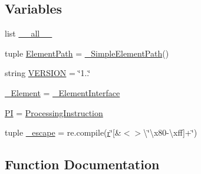 \subsection*{Variables}
\begin{DoxyCompactItemize}
\item 
list \hyperlink{namespacePyQt-x11-gpl-4_811_82_1_1elementtree_1_1ElementTree_ad8cd84242cec6f65061963a8bcc2ce48}{\+\_\+\+\_\+all\+\_\+\+\_\+}
\item 
tuple \hyperlink{namespacePyQt-x11-gpl-4_811_82_1_1elementtree_1_1ElementTree_a2e7ab0b9092c3db34b5f273220506b52}{Element\+Path} = \hyperlink{classPyQt-x11-gpl-4_811_82_1_1elementtree_1_1ElementTree_1_1__SimpleElementPath}{\+\_\+\+Simple\+Element\+Path}()
\item 
string \hyperlink{namespacePyQt-x11-gpl-4_811_82_1_1elementtree_1_1ElementTree_afe7ce87e065a19e640fb9f1b94b4aff3}{V\+E\+R\+S\+I\+O\+N} = \char`\"{}1..\char`\"{}
\item 
\hyperlink{namespacePyQt-x11-gpl-4_811_82_1_1elementtree_1_1ElementTree_abd18170428926afb1f3e22a622cdc9e1}{\+\_\+\+Element} = \hyperlink{classPyQt-x11-gpl-4_811_82_1_1elementtree_1_1ElementTree_1_1__ElementInterface}{\+\_\+\+Element\+Interface}
\item 
\hyperlink{namespacePyQt-x11-gpl-4_811_82_1_1elementtree_1_1ElementTree_a25e3990c1d4227261b76d8d4861d1193}{P\+I} = \hyperlink{namespacePyQt-x11-gpl-4_811_82_1_1elementtree_1_1ElementTree_a67d91b8c5e5e849edcc3bb4660f423a8}{Processing\+Instruction}
\item 
tuple \hyperlink{namespacePyQt-x11-gpl-4_811_82_1_1elementtree_1_1ElementTree_af123399fce552ef11c2d1e5d594bf190}{\+\_\+escape} = re.\+compile(\hyperlink{indexexpr_8h_ac434fd11cc2493608d8d91424d60c17e}{r}\char`\"{}\mbox{[}\&$<$$>$\textbackslash{}\char`\"{}\textbackslash{}x80-\/\textbackslash{}xff\mbox{]}+\char`\"{})
\end{DoxyCompactItemize}


\subsection{Function Documentation}
\hypertarget{namespacePyQt-x11-gpl-4_811_82_1_1elementtree_1_1ElementTree_ae148c00f5ee7597abc424c8cecb66cfc}{}
